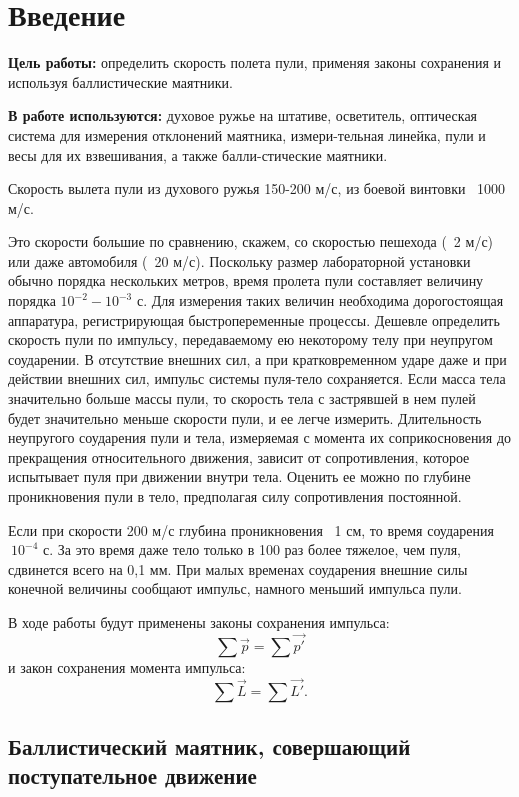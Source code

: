 \section{Введение}

\textbf{Цель работы:}
определить скорость полета пули, применяя законы сохранения и используя баллистические маятники.

\textbf{В работе используются:}
духовое ружье на штативе, осветитель, оптическая система для измерения отклонений маятника, измери-тельная линейка, пули и весы для их взвешивания, а также балли-стические маятники.


Скорость вылета пули из духового ружья 150-200 м/с, из боевой винтовки ~1000 м/с.

Это скорости большие по сравнению, скажем, со скоростью пешехода (~2 м/с) или даже автомобиля (~20 м/с). Поскольку размер лабораторной установки обычно порядка нескольких метров, время пролета пули составляет величину порядка $10^{-2}-10^{-3}$ с. Для измерения таких величин необходима дорогостоящая аппаратура, регистрирующая быстропеременные процессы. Дешевле определить скорость пули по импульсу, передаваемому ею некоторому телу при неупругом соударении. В отсутствие внешних сил, а при кратковременном ударе даже и при действии внешних сил, импульс системы пуля-тело сохраняется. Если масса тела значительно больше массы пули, то скорость тела с застрявшей в нем пулей будет значительно меньше скорости пули, и ее легче измерить. Длительность неупругого соударения пули и тела, измеряемая с момента их соприкосновения до прекращения относительного движения, зависит от сопротивления, которое испытывает пуля при движении внутри тела. Оценить ее можно по глубине проникновения пули в тело, предполагая силу сопротивления постоянной.

Если при скорости 200 м/с глубина проникновения ~1 см, то время соударения $~10^{-4}$ с. За это время даже тело только в 100 раз более тяжелое, чем пуля, сдвинется всего на 0,1 мм. При малых временах соударения внешние силы конечной величины сообщают импульс, намного меньший импульса пули.

В ходе работы будут применены законы сохранения импульса:
\[\sum \vec{p} = \sum \vec{p'}\]
и закон сохранения момента импульса:
\[\sum \vec{L} = \sum \vec{L'}.\]

\subsection{Баллистический маятник, совершающий поступательное движение}

